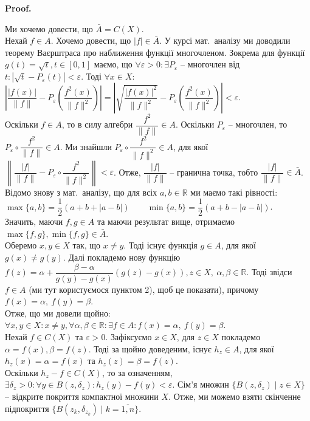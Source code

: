 \documentclass[a4paper, 10pt]{article}
\makeatletter
\theoremstyle{theoremdd}
\theoremstyle{theoremdd}
\theoremstyle{theoremdd}
\theoremstyle{theoremdd}
\theoremstyle{theoremdd}
\theoremstyle{theoremdd}
\theoremstyle{theoremdd}
\theoremstyle{theoremdd}
\renewenvironment{proof}[1][Proof.\\]{\par
\pushQED{\hfill \qed}%
\normalfont \topsep6\p@\@plus6\p@\relax
\trivlist
\item\relax
{\bfseries
#1\@addpunct{.}}\hspace\labelsep\ignorespaces
}{%
\popQED\endtrivlist\@endpefalse
}
\makeatother
\begin{document}
\begin{proof}
Ми хочемо довести, що $\bar{A} = C(X)$.\\
Нехай $f \in A$. Хочемо довести, що $|f| \in \bar{A}$. У курсі мат.\ аналізу ми доводили теорему Ваєрштраса про наближення функції многочленом. Зокрема для функції $g(t) = \sqrt{t}, t \in [0,1]$ маємо, що $\forall \varepsilon > 0: \exists P_\varepsilon$ -- многочлен від $t: |\sqrt{t} - P_\varepsilon(t)| < \varepsilon$. Тоді $\forall x \in X:$\\
$\left| \dfrac{|f(x)|}{\|f\|} - P_\varepsilon\left( \dfrac{f^2(x)}{\|f\|^2} \right) \right| = \left| \sqrt{\dfrac{|f(x)|^2}{\|f\|^2}} - P_\varepsilon\left( \dfrac{f^2(x)}{\|f\|^2} \right) \right| < \varepsilon$.\\
Оскільки $f \in A$, то в силу алгебри $\dfrac{f^2}{\|f\|} \in A$. Оскільки $P_\varepsilon$ -- многочлен, то $P_\varepsilon \circ \dfrac{f^2}{\|f\|} \in A$. Ми знайшли $P_\varepsilon \circ \dfrac{f^2}{\|f\|^2} \in A$, для якої $\left\| \dfrac{|f|}{\|f\|} - P_\varepsilon \circ \dfrac{f^2}{\|f\|^2} \right\| < \varepsilon$. Отже, $\dfrac{|f|}{\|f\|}$ -- гранична точка, тобто $\dfrac{|f|}{\|f\|} \in \bar{A}$.\\
Відомо знову з мат.\ аналізу, що для всіх $a,b \in \mathbb{R}$ ми маємо такі рівності:\\
$\max\{a,b\} = \dfrac{1}{2}\left(a+b+|a-b|\right) \qquad \min\{a,b\} = \dfrac{1}{2}\left(a+b-|a-b|\right)$.\\
Значить, маючи $f,g \in A$ та маючи результат вище, отримаємо $\max \{f,g\}, \min\{f,g\} \in \bar{A}$.\\
Оберемо $x,y \in X$ так, що $x \neq y$. Тоді існує функція $g \in A$, для якої $g(x) \neq g(y)$. Далі покладемо нову функцію $f(z) = \alpha + \dfrac{\beta-\alpha}{g(y)-g(x)}(g(z)-g(x)), z \in X,\ \alpha,\beta \in \mathbb{R}$. Тоді звідси $f \in A$ (ми тут користуємося пунктом 2), щоб це показати), причому $f(x) = \alpha,\ f(y) = \beta$.\\
Отже, що ми довели щойно: $\forall x,y \in X: x \neq y, \forall \alpha,\beta \in \mathbb{R}: \exists f \in A: f(x) = \alpha,\ f(y) = \beta$.
\bigskip \\
Нехай $f \in C(X)$ та $\varepsilon > 0$. Зафіксуємо $x \in X$, для $z \in X$ покладемо $\alpha = f(x), \beta = f(z)$. Тоді за щойно доведеним, існує $h_z \in A$, для якої $h_z(x) = \alpha = f(x)$ та $h_z(z) = \beta = f(z)$.\\
Оскільки $h_z - f \in C(X)$, то за означенням, $\exists \delta_z > 0: \forall y \in B(z,\delta_z): h_z(y)-f(y) < \varepsilon$. Сім'я множин $\{B(z,\delta_z) \mid z \in X\}$ -- відкрите покриття компактної множини $X$. Отже, ми можемо взяти скінченне підпокриття $\{B(z_k,\delta_{z_k}) \mid k = \overline{1,n}\}$.\\

\end{proof}
\end{document}
